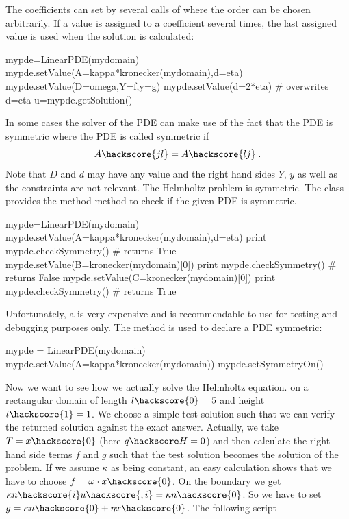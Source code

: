 The coefficients can set by several calls of  where the order can be chosen arbitrarily. 
If a value is assigned to a coefficient several times, the last assigned value is used when
the solution is calculated:
\begin{python}
mypde=LinearPDE(mydomain)
mypde.setValue(A=kappa*kronecker(mydomain),d=eta)
mypde.setValue(D=omega,Y=f,y=g)
mypde.setValue(d=2*eta) # overwrites d=eta
u=mypde.getSolution()
\end{python}
In some cases the solver of the PDE can make use of the fact that the PDE is symmetric where the 
PDE is called symmetric if 
\begin{equation}\label{LINEARPDE.SINGLE.4  TUTORIAL}
A\hackscore{jl}=A\hackscore{lj}\;.
\end{equation}
Note that $D$ and $d$ may have any value and the right hand sides $Y$, $y$ as well as the constraints
are not relevant. The Helmholtz problem is symmetric. 
The \LinearPDE class provides the method  method to check if the given PDE is symmetric. 
\begin{python}
mypde=LinearPDE(mydomain)
mypde.setValue(A=kappa*kronecker(mydomain),d=eta)
print mypde.checkSymmetry() # returns True
mypde.setValue(B=kronecker(mydomain)[0])
print mypde.checkSymmetry() # returns False
mypde.setValue(C=kronecker(mydomain)[0])
print mypde.checkSymmetry() # returns True
\end{python}
Unfortunately, a  is very expensive and is recommendable to use for
testing and debugging purposes only. The  method is used to
declare a PDE symmetric:
\begin{python}
mypde = LinearPDE(mydomain)
mypde.setValue(A=kappa*kronecker(mydomain))
mypde.setSymmetryOn()
\end{python}
Now we want to see how we actually solve the Helmholtz equation.
on a rectangular domain
of length $l\hackscore{0}=5$ and height $l\hackscore{1}=1$. We choose a simple test solution such that we 
can verify the returned solution against the exact answer. Actually, we 
take $T=x\hackscore{0}$ (here $q\hackscore H = 0$) and then calculate the right hand side terms $f$ and $g$ such that
the test solution becomes the solution of the problem. If we assume $\kappa$ as being constant, 
an easy calculation shows that we have to choose $f=\omega \cdot x\hackscore{0}$. On the boundary we get
$\kappa n\hackscore{i} u\hackscore{,i}=\kappa n\hackscore{0}$.  
So we have to set $g=\kappa n\hackscore{0}+\eta x\hackscore{0}$. The following script  
